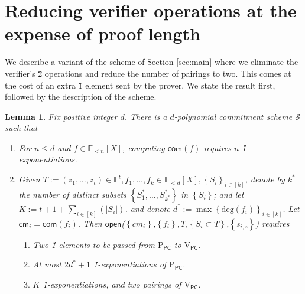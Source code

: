 \documentclass[11pt]{article} %
\newcommand{\F}{\ensuremath{\mathbb F}\xspace}
\newcommand{\com}{\ensuremath{\mathsf{com}}\xspace}
\newcommand{\cm}{\ensuremath{\mathsf{cm}}\xspace}
\newcommand{\open}{\ensuremath{\mathsf{open}}\xspace}
\renewcommand{\deg}{\ensuremath{\mathrm{deg}}\xspace}
\newcommand{\defeq}{:=}
\newcommand{\sett}[2]{\ensuremath{\set{#1}_{#2}}\xspace}
\newcommand{\prvpc}{\ensuremath{\mathrm{P_{\mathsf{PC}}}}\xspace}
\newcommand{\verpc}{\ensuremath{\mathrm{V_{\mathsf{PC}}}}\xspace}
\newcommand{\set}[1]{\ensuremath{\left\{#1\right\}}\xspace}
\newcommand{\polysofdeg}[1]{\ensuremath{\F_{< #1}[X]}\xspace}
\newcommand{\PCscheme}{\ensuremath{\mathscr{S}}\xspace}
\newcommand{\sumi}[1]{\sum_{i\in[#1]}}
\newtheorem{lemma}{Lemma}[section]
\begin{document}
\section{Reducing verifier operations at the expense of proof length}
We describe a variant of the scheme of Section \ref{sec:main} where we eliminate the verifier's \G2 operations and reduce the number of pairings to two. This comes at the cost of an extra \G1 element sent by the prover. We state the result first, followed by the description of the scheme.

\begin{lemma}\label{lem:multikateG1}
 Fix positive integer $d$.
  There is a $d$-polynomial commitment scheme \PCscheme such that
  \begin{enumerate}
   \item For $n\leq d$ and $f\in \polysofdeg{n}$, computing $\com(f)$ requires $n$ \G1-exponentiations.
   \item Given $T \defeq (z_1,\ldots,z_t)\in \F^t, f_1,\ldots, f_k \in \polysofdeg{d}, \sett{S_i}{i\in [k]}$, denote by $k^*$ the number of distinct subsets  \set{S^*_1,\ldots,S^*_{k^*}} in \set{S_i}; and 
   let $K\defeq t+ 1 + \sumi {k}\left( |S_i|\right)$.
   and denote $d^* \defeq \max\sett{\deg(f_i)}{i\in [k]}$.
   Let $\cm_i = \com(f_i)$.
   Then \open(\set{cm_i},\set{f_i},T,\set{S_i\subset T},\set{s_{i,z}})  requires
   \begin{enumerate}
   \item Two  \G1 elements to be passed from \prvpc to \verpc.
    \item At most $2d^*+1$ \G1-exponentiations of \prvpc.
    \item $K$ \G1-exponentiations,  and two pairings of \verpc.
    \end{enumerate}
\end{enumerate}

 \end{lemma}
\end{document}
